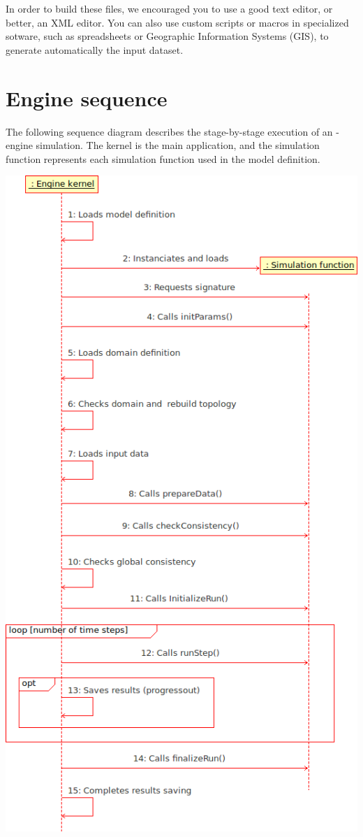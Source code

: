 \noindent In order to build these files, we encouraged you to use a good text editor, or better, an XML editor.
You can also use custom scripts or macros in specialized sotware, such as spreadsheets or Geographic Information Systems (GIS), to generate automatically the input dataset.

\bigskip

\section{Engine sequence}

The following sequence diagram describes the stage-by-stage execution of an \OFEname -engine simulation. The kernel is the main application, and the simulation function represents each simulation function used in the model definition.   

\begin{latexonly}
\begin{center}
\includegraphics[scale=0.6]{common/graphics/ofeseq.png}
\end{center}
\end{latexonly}

